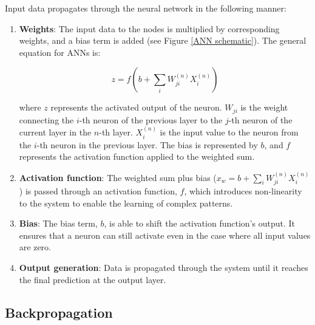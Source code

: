 Input data propagates through the neural network in the following manner:
\begin{enumerate}
	\item \textbf{Weights}: The input data to the nodes is multiplied by corresponding weights, and a bias term is added (see Figure \ref{ANN schematic}). The general equation for ANNs is:
	
	\begin{equation}\label{Generalised ANN1}
		z = f(b+\sum_i W_{j i}^{(n)} X_i^{(n)})
	\end{equation}
	
	where $z$ represents the activated output of the neuron. $W_{j i}$ is the weight connecting the $i$-th neuron of the previous layer to the $j$-th neuron of the current layer in the $n$-th layer. $X_i^{(n)}$ is the input value to the neuron from the $i$-th neuron in the previous layer. The bias is represented by $b$, and $f$ represents the activation function applied to the weighted sum.
	
	\item \textbf{Activation function}: The weighted sum plus bias ($x_w = b+\sum_i W_{j i}^{(n)} X_i^{(n)}$) is passed through an activation function, $f$, which introduces non-linearity to the system to enable the learning of complex patterns.
	
	\item \textbf{Bias}: The bias term, $b$, is able to shift the activation function's output. It ensures that a neuron can still activate even in the case where all input values are zero.
	
	\item \textbf{Output generation}: Data is propagated through the system until it reaches the final prediction at the output layer.
\end{enumerate}

\subsection{Backpropagation}

